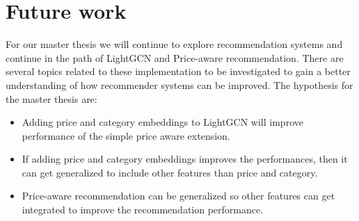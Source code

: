 \section{Future work}
For our master thesis we will continue to explore recommendation systems and continue in the path of LightGCN and Price-aware recommendation.
There are several topics related to these implementation to be investigated to gain a better understanding of how recommender systems can be improved.
The hypothesis for the master thesis are:
\begin{itemize}
    \item Adding price and category embeddings to LightGCN will improve performance of the simple price aware extension.
    \item If adding price and category embeddings improves the performances, then it can get generalized to include other features than price and category.
    \item Price-aware recommendation can be generalized so other features can get integrated to improve the recommendation performance.
\end{itemize}
